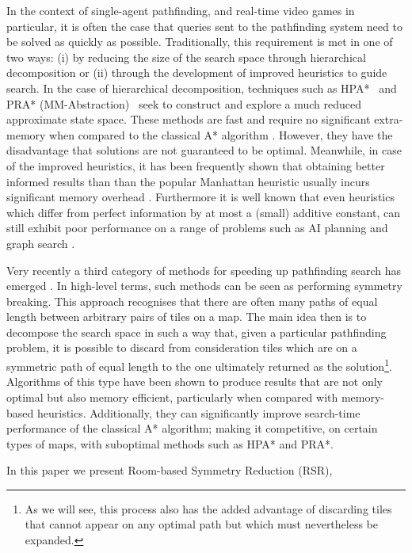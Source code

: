 \par
In the context of single-agent pathfinding, and real-time video games in particular, it is often the case that queries sent to
the pathfinding system  need to be solved as quickly as possible.
Traditionally, this requirement is met in one of two ways: (i) by reducing the size of the search space through hierarchical 
decomposition or (ii) through the development of improved heuristics to guide search.
In the case of hierarchical decomposition, techniques such as
HPA*~\cite{botea04} and PRA* (MM-Abstraction)~\cite{sturtevant07} seek to construct and explore
a much reduced approximate state space.
These methods are fast and require no significant extra-memory when compared to the classical
A* algorithm \cite{hart68}.
However, they have the disadvantage that solutions are not guaranteed to be optimal.
Meanwhile, in case of the improved heuristics, it has been frequently shown
that obtaining better informed results than than the popular
Manhattan heuristic usually incurs significant memory overhead 
\cite{sturtevant09,goldberg05,Cazenave:06,bjornsson06}.
Furthermore it is well known that even heuristics which differ from perfect information 
by at most a (small) additive constant, can still exhibit poor performance on a range of 
problems such as AI planning and graph search \cite{helmert08,pohl77}.
\par
Very recently a third category of methods for speeding up pathfinding search has emerged
\cite{bjornsson06,pochter10,harabor10}.
In high-level terms, such methods can be seen as performing symmetry breaking.
This approach recognises that there are often many paths of equal length between arbitrary pairs of tiles on a map.
The main idea then is to decompose the search space in such a way that, given a particular pathfinding problem, it is possible to
discard from consideration tiles which are on a symmetric path of equal length to the one ultimately returned 
as the solution\footnote{
As we will see, this process also has the added advantage of discarding tiles 
that cannot appear on any optimal path but which must nevertheless be expanded.}.
Algorithms of this type have been  shown to produce results that are not only optimal but also memory efficient, 
particularly when compared with memory-based heuristics.
Additionally, they can significantly improve search-time performance of the classical A* algorithm; making it competitive,
on certain types of maps, with suboptimal methods such as HPA* and PRA*.
\par
In this paper we present Room-based Symmetry Reduction (RSR),
